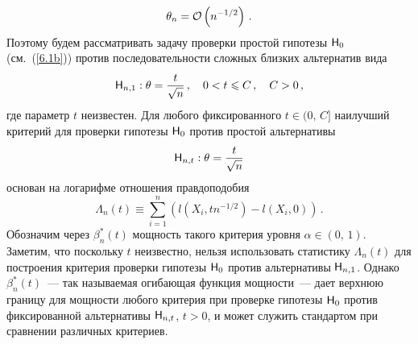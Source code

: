 \begin{multicols}{2}
\begin{equation*}
\theta_n = {\cal O}\left (n^{-1/2}\right )\,.
\end{equation*}
Поэтому будем рассматривать задачу проверки прос\-той гипотезы ${\sf H}_0$
(см.~(\ref{6.1b})) против последовательности сложных близких
альтернатив вида
\begin{equation*}
{\sf H}_{n,1}: \theta = \fr{t}{\sqrt{n}}\,,\quad 0<t\le C\,,\quad
C>0\,, %
\end{equation*}
где параметр $t$ неизвестен. Для любого
фиксированного $t\in (0,\,C]$ наилучший критерий для проверки
гипотезы ${\sf H}_0$ против простой альтернативы
\begin{equation*}
{\sf H}_{n,t}:\theta = \displaystyle\frac{\displaystyle t\mathstrut}{\displaystyle \sqrt{n}\mathstrut}
\end{equation*}
 основан на логарифме отношения правдоподобия
\begin{equation}
\Lambda_n(t) \equiv \sum_{i=1}^{n}\left (
l(X_i,tn^{-1/2})-l(X_i,0)\right )\,.\label{6.15b}
\end{equation}
Обозначим через $\beta_n^*(t)$ мощность такого критерия уровня
$\alpha\in (0,\,1)$. Заметим, что поскольку $t$ неизвестно,
нельзя использовать статистику $\Lambda_n(t)$ для построения
критерия проверки гипотезы ${\sf H}_0$ против альтернативы ${\sf
H}_{n,1}$. Однако $\beta_n^*(t)$~--- так называемая огибающая
функция мощности~--- дает верхнюю границу для мощности любого
критерия при проверке гипотезы ${\sf H}_0$ против фиксированной
альтернативы ${\sf H}_{n,t}$, $t>0$, и может служить
стандартом при сравнении различных критериев.


\end{multicols}
